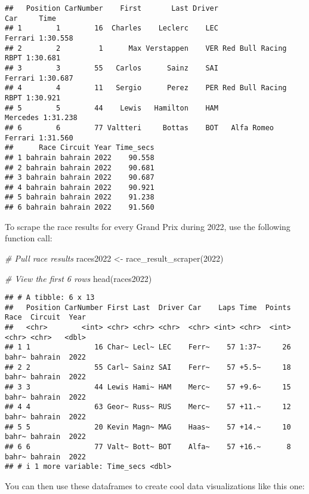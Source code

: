 \documentclass[
]{book}
\newenvironment{Shaded}{\begin{snugshade}}{\end{snugshade}}
\newcommand{\CommentTok}[1]{\textcolor[rgb]{0.56,0.35,0.01}{\textit{#1}}}
\newcommand{\DecValTok}[1]{\textcolor[rgb]{0.00,0.00,0.81}{#1}}
\newcommand{\FunctionTok}[1]{\textcolor[rgb]{0.00,0.00,0.00}{#1}}
\newcommand{\NormalTok}[1]{#1}
\newcommand{\OtherTok}[1]{\textcolor[rgb]{0.56,0.35,0.01}{#1}}
\begin{document}
\begin{verbatim}
##   Position CarNumber    First       Last Driver                  Car     Time
## 1        1        16  Charles    Leclerc    LEC              Ferrari 1:30.558
## 2        2         1      Max Verstappen    VER Red Bull Racing RBPT 1:30.681
## 3        3        55   Carlos      Sainz    SAI              Ferrari 1:30.687
## 4        4        11   Sergio      Perez    PER Red Bull Racing RBPT 1:30.921
## 5        5        44    Lewis   Hamilton    HAM             Mercedes 1:31.238
## 6        6        77 Valtteri     Bottas    BOT   Alfa Romeo Ferrari 1:31.560
##      Race Circuit Year Time_secs
## 1 bahrain bahrain 2022    90.558
## 2 bahrain bahrain 2022    90.681
## 3 bahrain bahrain 2022    90.687
## 4 bahrain bahrain 2022    90.921
## 5 bahrain bahrain 2022    91.238
## 6 bahrain bahrain 2022    91.560
\end{verbatim}

To scrape the race results for every Grand Prix during 2022, use the following function call:

\begin{Shaded}
\begin{Highlighting}[]
\CommentTok{\# Pull race results}
\NormalTok{races2022 }\OtherTok{\textless{}{-}} \FunctionTok{race\_result\_scraper}\NormalTok{(}\DecValTok{2022}\NormalTok{)}

\CommentTok{\# View the first 6 rows}
\FunctionTok{head}\NormalTok{(races2022)}
\end{Highlighting}
\end{Shaded}

\begin{verbatim}
## # A tibble: 6 x 13
##   Position CarNumber First Last  Driver Car    Laps Time  Points Race  Circuit  Year
##   <chr>        <int> <chr> <chr> <chr>  <chr> <int> <chr>  <int> <chr> <chr>   <dbl>
## 1 1               16 Char~ Lecl~ LEC    Ferr~    57 1:37~     26 bahr~ bahrain  2022
## 2 2               55 Carl~ Sainz SAI    Ferr~    57 +5.5~     18 bahr~ bahrain  2022
## 3 3               44 Lewis Hami~ HAM    Merc~    57 +9.6~     15 bahr~ bahrain  2022
## 4 4               63 Geor~ Russ~ RUS    Merc~    57 +11.~     12 bahr~ bahrain  2022
## 5 5               20 Kevin Magn~ MAG    Haas~    57 +14.~     10 bahr~ bahrain  2022
## 6 6               77 Valt~ Bott~ BOT    Alfa~    57 +16.~      8 bahr~ bahrain  2022
## # i 1 more variable: Time_secs <dbl>
\end{verbatim}

You can then use these dataframes to create cool data visualizations like this one:
\end{document}
